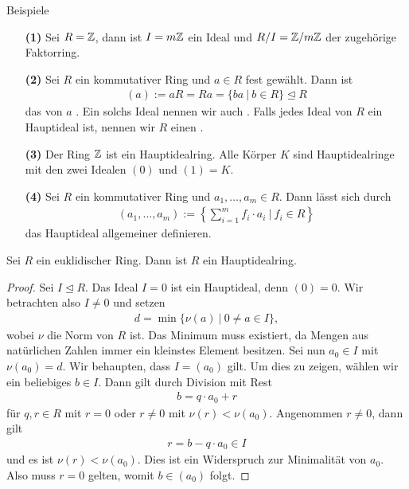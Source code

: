 \begin{genericdf}{Beispiele}\label{skript:8.2}
	\
	\begin{enumerate}
		\item[\textbf{(1)}]
		Sei $R = \mathbb{Z}$, dann ist $I = m \mathbb{Z}$ ein Ideal und $R/I = \mathbb{Z} / m \mathbb{Z}$ der zugehörige Faktorring.
		
		\item[\textbf{(2)}]
		Sei $R $ ein kommutativer Ring und $a \in R$ fest gewählt.
		Dann ist
		\begin{align*}
		(a) := aR = Ra = \lbrace ba \ | \ b \in R \rbrace \unlhd R
		\end{align*}
		das von $a$ .
		Ein solchs Ideal nennen wir auch .
		Falls jedes Ideal von $R$ ein Hauptideal ist, nennen wir $R$ einen .
		\index{Hauptideal!ring}
		
		\item[\textbf{(3)}]
		Der Ring $\mathbb{Z}$ ist ein Hauptidealring.
		Alle Körper $K$ sind Hauptidealringe mit den zwei Idealen $(0)$ und $(1) = K$.
		
		\item[\textbf{(4)}]
		Sei $R$ ein kommutativer Ring und $a_1, \dots , a_m \in R$.
		Dann lässt sich durch
		\begin{align*}
		(a_1, \dots, a_m) := \left\lbrace   \sum \limits_{i=1}^m f_i \cdot a_i \ | \ f_i \in R \right\rbrace 
		\end{align*}
		das Hauptideal allgemeiner definieren.
	\end{enumerate}
\end{genericdf}

\begin{sz} \label{skript:8.3}
	Sei $ R $ ein euklidischer Ring.
	Dann ist $ R $ ein Hauptidealring.
\end{sz}

\begin{proof}
	Sei $ I \unlhd R $.
	Das Ideal $ I = 0 $ ist ein Hauptideal, denn $ (0) = 0 $.
	Wir betrachten also $ I \neq 0 $ und setzen
	\begin{align*}
	d = \min \lbrace \nu(a) \ | \ 0 \neq a \in I \rbrace,
	\end{align*}
	wobei $ \nu $ die Norm von $ R $ ist.
	Das Minimum muss existiert, da Mengen aus natürlichen Zahlen immer ein kleinstes Element besitzen.
	Sei nun $ a_0 \in I $ mit $ \nu(a_0) = d$.
	Wir behaupten, dass $ I = (a_0) $ gilt.
	Um dies zu zeigen, wählen wir ein beliebiges $ b \in I $.
	Dann gilt durch Division mit Rest
	\begin{align*}
	b = q \cdot a_0 + r
	\end{align*}
	für $ q,r \in R $ mit $ r = 0 $ oder $ r \neq 0 $ mit $ \nu(r) < \nu(a_0) $.
	Angenommen $ r \neq 0 $, dann gilt
	\begin{align*}
	r = b - q\cdot a_0 \in I
	\end{align*}
	und es ist $ \nu(r) < \nu(a_0) $.
	Dies ist ein Widerspruch zur Minimalität von $ a_0 $.
	Also muss $ r = 0 $ gelten, womit $ b \in (a_0) $ folgt. 
\end{proof}


